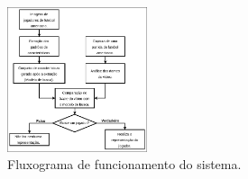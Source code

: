 \begin{figure}
    \centering
    \caption{\label{fig_fluxograma_proj}Fluxograma de funcionamento do sistema.}
    \includegraphics[width=155px]{05-SLIDES_DESENVOLVIMENTO/Imagens/fluxograma-projeto.png}
\end{figure}